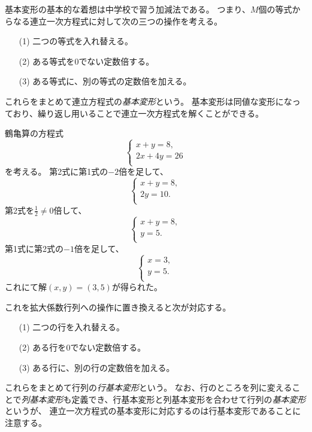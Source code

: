 基本変形の基本的な着想は中学校で習う加減法である。
つまり、$M$個の等式からなる連立一次方程式に対して次の三つの操作を考える。
\begin{itemize}
\item[(1)]
二つの等式を入れ替える。
\item[(2)]
ある等式を$0$でない定数倍する。
\item[(3)]
ある等式に、別の等式の定数倍を加える。
\end{itemize}
これらをまとめて連立方程式の\emph{基本変形}という。
基本変形は同値な変形になっており、繰り返し用いることで連立一次方程式を解くことができる。

\begin{example}
鶴亀算の方程式
$$
\begin{cases}
x+y = 8, \\
2 x+4 y = 26 \\
\end{cases}
$$
を考える。
第2式に第1式の$-2$倍を足して、
$$
\begin{cases}
x+y = 8, \\
2 y = 10. \\
\end{cases}
$$
第2式を$\frac{1}{2} \ne 0$倍して、
$$
\begin{cases}
x+y = 8, \\
y = 5. \\
\end{cases}
$$
第1式に第2式の$-1$倍を足して、
$$
\begin{cases}
x = 3, \\
y = 5. \\
\end{cases}
$$
これにて解$(x, y) = (3, 5)$が得られた。
\end{example}

これを拡大係数行列への操作に置き換えると次が対応する。
\begin{itemize}
\item[(1)]
二つの行を入れ替える。
\item[(2)]
ある行を$0$でない定数倍する。
\item[(3)]
ある行に、別の行の定数倍を加える。
\end{itemize}
これらをまとめて行列の\emph{行基本変形}という。
なお、行のところを列に変えることで\emph{列基本変形}も定義でき、行基本変形と列基本変形を合わせて行列の\emph{基本変形}というが、
連立一次方程式の基本変形に対応するのは行基本変形であることに注意する。

